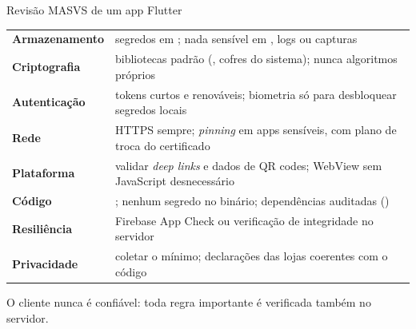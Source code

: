 \documentclass[aspectratio=169,10pt]{beamer}
\begin{document}
\begin{frame}{Revisão MASVS de um app Flutter}
  \footnotesize
  \begin{tabularx}{\textwidth}{@{}l L@{}}
    \toprule
     &  \\
    \midrule
    \textbf{Armazenamento} & segredos em ; nada sensível em , logs ou capturas \\
    \textbf{Criptografia} & bibliotecas padrão (, cofres do sistema); nunca algoritmos próprios \\
    \textbf{Autenticação} & tokens curtos e renováveis; biometria só para desbloquear segredos locais \\
    \textbf{Rede} & HTTPS sempre; \emph{pinning} em apps sensíveis, com plano de troca do certificado \\
    \textbf{Plataforma} & validar \emph{deep links} e dados de QR codes; WebView sem JavaScript desnecessário \\
    \textbf{Código} & ; nenhum segredo no binário; dependências auditadas () \\
    \textbf{Resiliência} & Firebase App Check ou verificação de integridade no servidor \\
    \textbf{Privacidade} & coletar o mínimo; declarações das lojas coerentes com o código \\
    \bottomrule
  \end{tabularx}
  \vspace{4pt}
  \begin{destaque}
    O cliente nunca é confiável: toda regra importante é verificada também no servidor.
  \end{destaque}
\end{frame}
\end{document}
